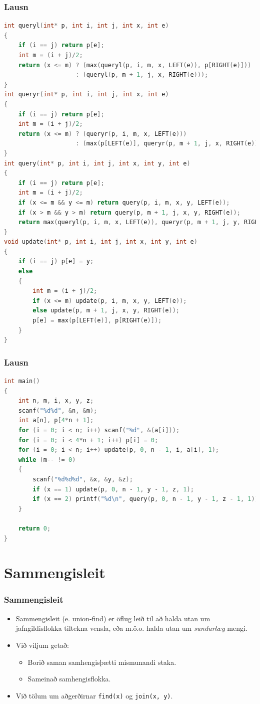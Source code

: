 \documentclass{beamer}
\begin{document}
\begin{frame}[fragile]
	\frametitle{Lausn}
	\tiny
	\begin{lstlisting}[language=C]
int queryl(int* p, int i, int j, int x, int e)
{
	if (i == j) return p[e];
	int m = (i + j)/2;
	return (x <= m) ? (max(queryl(p, i, m, x, LEFT(e)), p[RIGHT(e)]))
                    : (queryl(p, m + 1, j, x, RIGHT(e)));
}
int queryr(int* p, int i, int j, int x, int e)
{
	if (i == j) return p[e];
	int m = (i + j)/2;
	return (x <= m) ? (queryr(p, i, m, x, LEFT(e)))
                    : (max(p[LEFT(e)], queryr(p, m + 1, j, x, RIGHT(e))));
}
int query(int* p, int i, int j, int x, int y, int e)
{
	if (i == j) return p[e];
	int m = (i + j)/2;
	if (x <= m && y <= m) return query(p, i, m, x, y, LEFT(e));
	if (x > m && y > m) return query(p, m + 1, j, x, y, RIGHT(e));
	return max(queryl(p, i, m, x, LEFT(e)), queryr(p, m + 1, j, y, RIGHT(e)));
}
void update(int* p, int i, int j, int x, int y, int e)
{
	if (i == j) p[e] = y;
	else
	{
		int m = (i + j)/2;
		if (x <= m) update(p, i, m, x, y, LEFT(e));
		else update(p, m + 1, j, x, y, RIGHT(e));
		p[e] = max(p[LEFT(e)], p[RIGHT(e)]);
	}
}
	\end{lstlisting}
\end{frame}

\begin{frame}[fragile]
	\frametitle{Lausn}
	\tiny
	\begin{lstlisting}[language=C]
int main()
{
	int n, m, i, x, y, z;
	scanf("%d%d", &n, &m);
	int a[n], p[4*n + 1];
	for (i = 0; i < n; i++) scanf("%d", &(a[i]));
	for (i = 0; i < 4*n + 1; i++) p[i] = 0;
	for (i = 0; i < n; i++) update(p, 0, n - 1, i, a[i], 1);
	while (m-- != 0)
	{
		scanf("%d%d%d", &x, &y, &z);
		if (x == 1) update(p, 0, n - 1, y - 1, z, 1);
		if (x == 2) printf("%d\n", query(p, 0, n - 1, y - 1, z - 1, 1));
	}

	return 0;
}
	\end{lstlisting}
\end{frame}

\section[Sammengisleit]{Sammengisleit}

\begin{frame}
\frametitle{Sammengisleit}
\begin{itemize}

\item<1-> Sammengisleit (e. union-find) er öflug leið til að halda utan um jafngildisflokka tiltekna vensla,
	eða m.ö.o. halda utan um \emph{sundurlæg} mengi.
\item<2-> Við viljum getað:
	\begin{itemize}
		\item<3-> Borið saman samhengisþætti mismunandi staka.
		\item<4-> Sameinað samhengisflokka.
	\end{itemize}
\item<5-> Við tölum um aðgerðirnar \texttt{find(x)} og \texttt{join(x, y)}.

\end{itemize}
\end{frame}
\end{document}
